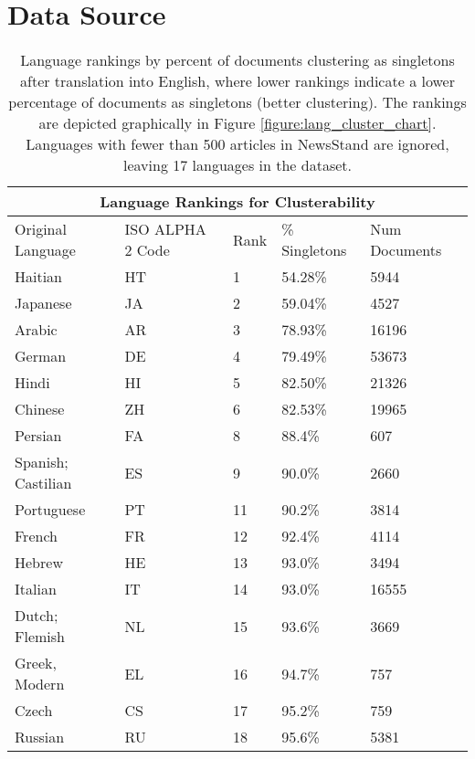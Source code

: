 \section{Data Source}\label{section:data}

\begin{table*}[ht!]
\begin{tabular}{ |p{3cm}||p{2.5cm}|p{1cm}|p{2cm}|p{2.5cm}||  }
 \hline
 \multicolumn{5}{|c|}{Language Rankings for Clusterability} \\
 \hline
 Original Language & ISO ALPHA 2 Code & Rank & \% Singletons & Num Documents\\
 \hline
 Haitian   & HT    & 1 & 54.28\% & 5944\\
 Japanese &   JA  &  2 & 59.04\% & 4527\\
 Arabic & AR & 3 & 78.93\% & 16196\\
 German & DE & 4 & 79.49\% & 53673\\
 Hindi &   HI  & 5 & 82.50\% & 21326\\
 Chinese & ZH  & 6 & 82.53\% & 19965\\
 Persian & FA & 8 & 88.4\% & 607\\
 Spanish; Castilian & ES & 9 & 90.0\% & 2660\\
 Portuguese & PT & 11 & 90.2\% & 3814\\
 French & FR & 12 & 92.4\% & 4114\\
 Hebrew & HE & 13 & 93.0\% & 3494\\
 Italian & IT & 14 & 93.0\% & 16555\\
 Dutch; Flemish & NL & 15 & 93.6\% & 3669\\
 Greek, Modern & EL & 16 & 94.7\% & 757\\
 Czech & CS & 17 & 95.2\% & 759\\
 Russian & RU & 18 & 95.6\% & 5381\\
 \hline
\end{tabular}
\caption{Language rankings by percent of documents clustering as singletons after translation into English, where lower rankings indicate a lower percentage of documents as singletons (better clustering). The rankings are depicted graphically in Figure \ref{figure:lang_cluster_chart}. Languages with fewer than 500 articles in NewsStand are ignored, leaving 17 languages in the dataset.}
\label{table:cluster_score}
\end{table*}

